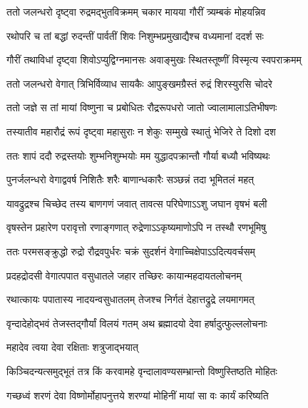 

\twolineshloka
{ततो जलन्धरो दृष्ट्वा रुद्रमद्भुतविक्रमम्}
{चकार मायया गौरीं त्र्यम्बकं मोहयन्निव} %

\twolineshloka
{रथोपरि च तां बद्धां रुदन्तीं पार्वतीं शिवः}
{निशुम्भप्रमुखाद्यैश्च वध्यमानां ददर्श सः} %

\twolineshloka
{गौरीं तथाविधां दृष्ट्वा शिवोऽप्युद्विग्नमानसः}
{अवाङ्मुखः स्थितस्तूष्णीं विस्मृत्य स्वपराक्रमम्} %

\twolineshloka
{ततो जलन्धरो वेगात् त्रिभिर्विव्याध सायकैः}
{आपुङ्खमग्रैस्तं रुद्रं शिरस्युरसि चोदरे} %

\twolineshloka
{ततो जज्ञे स तां मायां विष्णुना च प्रबोधितः}
{रौद्ररूपधरो जातो ज्वालामालाऽतिभीषणः} %

\twolineshloka
{तस्यातीव महारौद्रं रूपं दृष्ट्वा महासुराः}
{न शेकुः सम्मुखे स्थातुं भेजिरे ते दिशो दश} %

\twolineshloka
{ततः शापं ददौ रुद्रस्तयोः शुम्भनिशुम्भयोः}
{मम युद्धादपक्रान्तौ गौर्या बध्यौ भविष्यथः} %

\twolineshloka
{पुनर्जलन्धरो वेगाद्ववर्ष निशितैः शरैः}
{बाणान्धकारैः सञ्छन्नं तदा भूमितलं महत्} %

\twolineshloka
{यावद्रुद्रश्च चिच्छेद तस्य बाणगणं जवात्}
{तावत्स परिघेणाऽऽशु जघान वृषभं बली} %

\twolineshloka
{वृषस्तेन प्रहारेण परावृत्तो रणाङ्गणात्}
{रुद्रेणाऽऽकृष्यमाणोऽपि न तस्थौ रणभूमिषु} %

\twolineshloka
{ततः परमसङ्क्रुद्धो रुद्रो रौद्रवपुर्धरः}
{चक्रं सुदर्शनं वेगाच्चिक्षेपाऽऽदित्यवर्चसम्} %

\twolineshloka
{प्रदहद्रोदसी वेगात्पपात वसुधातले}
{जहार तच्छिरः कायान्महदायतलोचनम्} %

\twolineshloka
{रथात्कायः पपातास्य नादयन्वसुधातलम्}
{तेजश्च निर्गतं देहात्तद्रुद्रे लयमागमत्} %

\twolineshloka
{वृन्दादेहोद्भवं तेजस्तद्गौर्यां विलयं गतम्}
{अथ ब्रह्मादयो देवा हर्षादुत्फुल्ललोचनाः} %




\onelineshloka
{महादेव त्वया देवा रक्षिताः शत्रुजाद्भयात्} %

\twolineshloka
{किञ्चिदन्यत्समुद्भूतं तत्र किं करवामहे}
{वृन्दालावण्यसम्भ्रान्तो विष्णुस्तिष्ठति मोहितः} %


\twolineshloka
{गच्छध्वं शरणं देवा विष्णोर्मोहापनुत्तये}
{शरण्यां मोहिनीं मायां सा वः कार्यं करिष्यति} %


